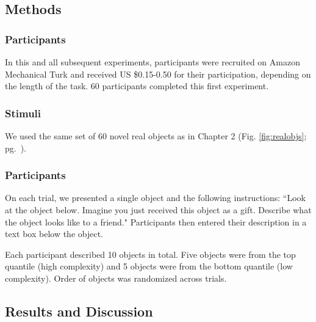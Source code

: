 \subsection{Methods}
\subsubsection{Participants} 
In this and all subsequent experiments, participants were recruited on Amazon Mechanical Turk and received US \$0.15-0.50 for their participation, depending on the length of the task. 60 participants completed this first experiment.
\subsubsection{Stimuli}  
We used the same set of 60 novel real objects as in Chapter 2 (Fig. \ref{fig:realobjs}; pg.\ \pageref{fig:realobjs}).
\subsubsection{Participants} 
On each trial, we presented a single object and the following instructions:  ``Look at the object below. Imagine you just received this object as a gift. Describe what the object looks like to a friend." Participants then entered their description in a text box below the object.

Each participant described 10 objects in total. Five objects were from the top quantile (high complexity) and 5 objects were from the bottom quantile (low complexity). Order of objects was randomized across trials.

\subsection{Results and Discussion}


